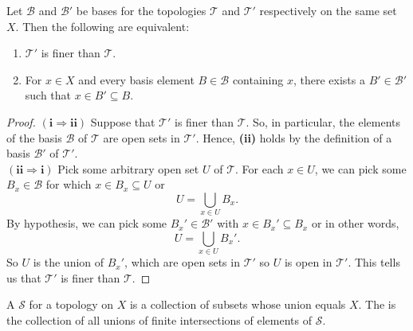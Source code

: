 \begin{theorem}\label{thm:basis-criterion-topological-fineness}
    Let \( \mathscr{B} \) and \( \mathscr{B}' \) be bases for the topologies \( \mathscr{T} \) and \( \mathscr{T}' \) respectively on the same set \( X \). Then the following are equivalent:
    \begin{enumerate}[label=\textbf{\roman*)}]
        \item \( \mathscr{T}' \) is finer than \( \mathscr{T} \). 
        \item For \( x \in X \) and every basis element \( B \in \mathscr{B} \) containing \( x \), there exists a \( B' \in \mathscr{B}' \) such that \( x \in B' \subseteq B \).
    \end{enumerate}
\end{theorem}
\begin{proof}
    \( \left( \textbf{i} \Rightarrow \textbf{ii} \right) \) Suppose that \( \mathscr{T}' \) is finer than \( \mathscr{T} \). So, in particular, the elements of the basis \( \mathscr{B} \) of \( \mathscr{T} \) are open sets in \( \mathscr{T}' \). Hence, \textbf{(ii)} holds by the definition of a basis \( \mathscr{B}' \) of \( \mathscr{T}' \). \\ 
    \( \left( \textbf{ii} \Rightarrow \textbf{i} \right) \) Pick some arbitrary open set \( U \) of \( \mathscr{T} \). For each \( x \in U \), we can pick some \( B_{x} \in \mathscr{B} \) for which \( x \in B_{x} \subseteq  U \) or 
    \[ U = \bigcup_{x \in U} B_{x}. \]
    By hypothesis, we can pick some \( B_{x}' \in \mathscr{B}' \) with \( x \in B_{x}' \subseteq  B_{x} \) or in other words, 
    \[ U = \bigcup_{x \in U} B_{x}'. \]
    So \( U \) is the union of \( B_{x}' \), which are open sets in \( \mathscr{T}' \) so \( U \) is open in \( \mathscr{T}' \). This tells us that \( \mathscr{T}' \) is finer than \( \mathscr{T} \).
\end{proof}

\begin{dfn}
    A  \( \mathscr{S} \) for a topology on \( X \) is a collection of subsets whose union equals \( X \). The  is the collection of all unions of finite intersections of elements of \( \mathscr{S} \).
\end{dfn}


